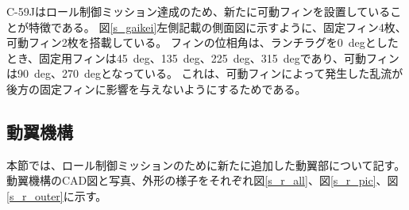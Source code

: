 \documentclass[a4paper,11pt,uplatex]{jsarticle}
\begin{document}
C-59Jはロール制御ミッション達成のため、新たに可動フィンを設置していることが特徴である。
図\ref{s_gaikei}左側記載の側面図に示すように、固定フィン4枚、可動フィン2枚を搭載している。
フィンの位相角は、ランチラグを\SI{0}{deg}としたとき、固定用フィンは\SI{45}{deg}、\SI{135}{deg}、\SI{225}{deg}、\SI{315}{deg}であり、可動フィンは\SI{90}{deg}、\SI{270}{deg}となっている。
これは、可動フィンによって発生した乱流が後方の固定フィンに影響を与えないようにするためである。

\subsection{動翼機構}
\label{douyoku}
本節では、ロール制御ミッションのために新たに追加した動翼部について記す。
動翼機構のCAD図と写真、外形の様子をそれぞれ図\ref{s_r_all}、図\ref{s_r_pic}、図\ref{s_r_outer}に示す。
\end{document}
